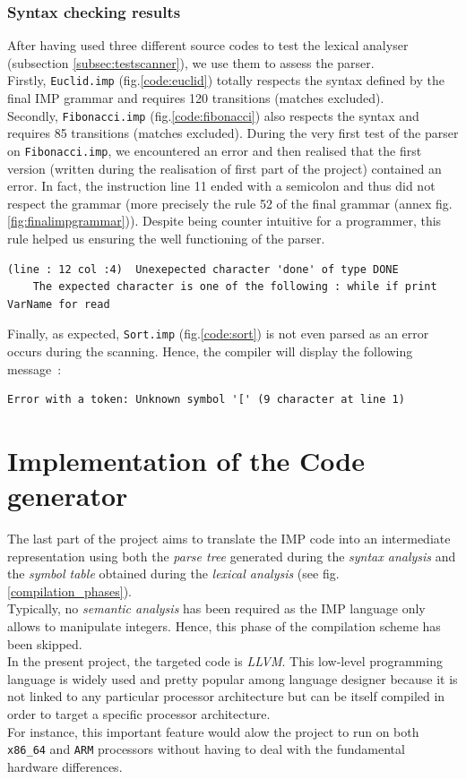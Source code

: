 \documentclass[a4paper,11pt]{article}
\begin{document}
    \subsubsection{Syntax checking results}  
      After having used three different source codes to test the lexical analyser (subsection \ref{subsec:testscanner}), we use them to assess the parser.\\
      Firstly, \verb|Euclid.imp| (fig.\ref{code:euclid}) totally respects the syntax defined by the final IMP grammar and requires 120 transitions (matches excluded).\\ %
      Secondly, \verb|Fibonacci.imp| (fig.\ref{code:fibonacci}) also respects the syntax and requires 85 transitions (matches excluded). During the very first test of the parser on \verb|Fibonacci.imp|, we encountered an error and then realised that the first version (written during the realisation of first part of the project) contained an error. In fact, the instruction line 11 ended with a semicolon and thus did not respect the grammar (more precisely the rule 52 of the final grammar (annex fig.\ref{fig:finalimpgrammar})). Despite being counter intuitive for a programmer, this rule helped us ensuring the well functioning of the parser.
        \begin{verbatim}
(line : 12 col :4)	Unexepected character 'done' of type DONE
    The expected character is one of the following : while if print VarName for read
        \end{verbatim}
    Finally, as expected, \verb|Sort.imp| (fig.\ref{code:sort}) is not even parsed as an error occurs during the scanning. Hence, the compiler will display the following message~:
      \begin{verbatim}
Error with a token: Unknown symbol '[' (9 character at line 1)
      \end{verbatim}
      
\section{Implementation of the Code generator}
  The last part of the project aims to translate the IMP code into an intermediate representation using both the \textit{parse tree} generated during the \textit{syntax analysis} and the \textit{symbol table} obtained during the \textit{lexical analysis} (see fig.\ref{compilation_phases}).\\
  Typically, no \textit{semantic analysis} has been required as the IMP language only allows to manipulate integers. Hence, this phase of the compilation scheme has been skipped.\\
  In the present project, the targeted code is \textit{LLVM}. This low-level programming language is widely used and pretty popular among language designer because it is not linked to any particular processor architecture but can be itself compiled in order to target a specific processor architecture.\\
  For instance, this important feature would alow the project to run on both \verb|x86_64| and \verb|ARM| processors without having to deal with the fundamental hardware differences.
\end{document}
